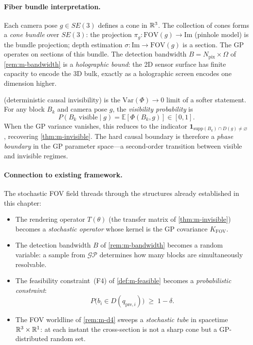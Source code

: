 \paragraph{Fiber bundle interpretation.}
Each camera pose $g \in SE(3)$ defines a cone in $\mathbb{R}^3$.  The
collection of cones forms a \emph{cone bundle} over $SE(3)$: the
projection $\pi_g \colon \mathrm{FOV}(g) \to \mathrm{Im}$ (pinhole
model) is the bundle projection; depth estimation
$\sigma \colon \mathrm{Im} \to \mathrm{FOV}(g)$ is a section.  The
GP operates on sections of this bundle.  The detection bandwidth
$B = N_{\mathrm{pix}} \times \Omega$ of
\cref{rem:m-bandwidth} is a \emph{holographic bound}: the 2D sensor
surface has finite capacity to encode the 3D bulk, exactly as a
holographic screen encodes one dimension higher.

\begin{remark}
\label{rem:m-soft-invisibility}
 (deterministic causal invisibility) is the
$\mathrm{Var}(\Phi) \to 0$ limit of a softer statement.  For any
block $B_k$ and camera pose $g$, the \emph{visibility probability}
is
\begin{equation}\label{eq:m-vis-prob}
  P(B_k \text{ visible} \mid g)
  = \mathbb{E}[\Phi(B_k, g)] \in [0,1].
\end{equation}
When the GP variance vanishes, this reduces to the indicator
$\mathbf{1}_{\mathrm{supp}(B_k) \cap D(g) \neq \varnothing}$,
recovering \cref{thm:m-invisible}.  The hard causal boundary is
therefore a \emph{phase boundary} in the GP parameter space---a
second-order transition between visible and invisible regimes.
\end{remark}

\paragraph{Connection to existing framework.}
The stochastic FOV field threads through the structures already
established in this chapter:
\begin{itemize}[nosep]
  \item The rendering operator $T(\theta)$ (the transfer matrix of
  \cref{thm:m-invisible}) becomes a \emph{stochastic operator}
  whose kernel is the GP covariance $K_{\mathrm{FOV}}$.
  \item The detection bandwidth $B$ of \cref{rem:m-bandwidth}
  becomes a random variable: a sample from
  $\mathcal{GP}$ determines how many blocks are simultaneously
  resolvable.
  \item The feasibility constraint~(F4) of
  \cref{def:m-feasible} becomes a \emph{probabilistic constraint}:
  \[
    P\bigl(b_i \in D(q_{\mathrm{pre},i})\bigr) \;\geq\; 1 - \delta.
  \]
  \item The FOV worldline of \cref{rem:m-d4} sweeps a
  \emph{stochastic tube} in spacetime $\mathbb{R}^3 \times \mathbb{R}^1$: at each
  instant the cross-section is not a sharp cone but a GP-distributed
  random set.
\end{itemize}

